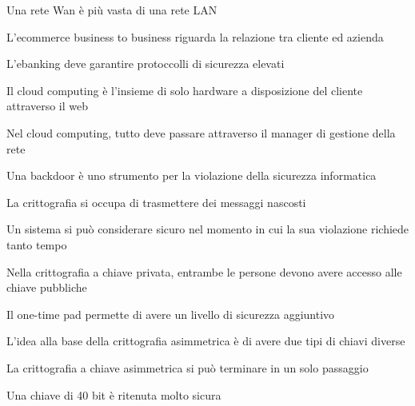 \documentclass[addpoints]{exam}
\newcommand{\tf}[1][{}]{%
	\fillin[#1][0.25in]%
}
\begin{document}
\begin{multicols}{2}
\begin{questions}
\question[1] \tf[T] Una rete Wan è più vasta di una rete LAN

\question[1] \tf[F] L'ecommerce business to business riguarda la relazione tra cliente ed azienda

\question[1] \tf[T]  L'ebanking deve garantire protoccolli di sicurezza elevati

\question[1] \tf[F] Il cloud computing è l'insieme di solo hardware a disposizione del cliente attraverso il web

\question[1] \tf[T] Nel cloud computing, tutto deve passare attraverso il manager di gestione della rete

\question[1] \tf[T] Una backdoor è uno strumento per la violazione della sicurezza informatica

\question[1] \tf[F] La crittografia si occupa di trasmettere dei messaggi nascosti

\question[1] \tf[T] Un sistema si può considerare sicuro nel momento in cui la sua violazione richiede tanto tempo

\question[1] \tf[F] Nella crittografia a chiave privata, entrambe le persone devono avere accesso alle chiave pubbliche

\question[1] \tf[T] Il one-time pad permette di avere un livello di sicurezza aggiuntivo

\question[1] \tf[T] L'idea alla base della crittografia asimmetrica è di avere due tipi di chiavi diverse

\question[1] \tf[F] La crittografia a chiave asimmetrica si può terminare in un solo passaggio

\question[1] \tf[T] Una chiave di 40 bit è ritenuta molto sicura
\end{questions}
\end{multicols}
\end{document}
